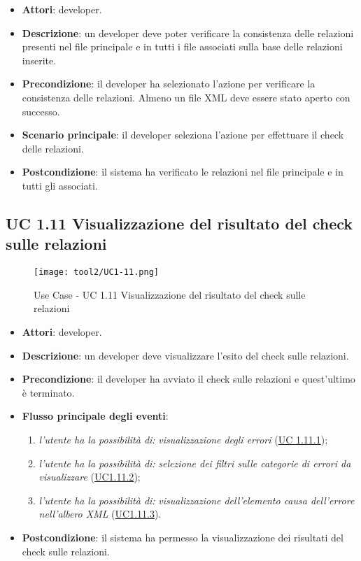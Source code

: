 		\begin{itemize}
			\item\textbf{Attori}: developer.
			\item\textbf{Descrizione}: un developer deve poter verificare la consistenza delle relazioni presenti nel file principale e in tutti i file associati sulla base delle relazioni inserite.
			\item\textbf{Precondizione}: il developer ha selezionato l'azione per verificare la consistenza delle relazioni. Almeno un file XML deve essere stato aperto con successo.
			\item\textbf{Scenario principale}: il developer seleziona l'azione per effettuare il check delle relazioni.
			\item\textbf{Postcondizione}: il sistema ha verificato le relazioni nel file principale e in tutti gli associati.
		\end{itemize}
		
	\subsection{UC 1.11 Visualizzazione del risultato del check sulle relazioni}
		\label{subsec:XEUC1.11}
		
		\begin{figure}[!h] 
			\centering 
			\texttt{[image: tool2/UC1-11.png]} 
			\caption{Use Case - UC 1.11 Visualizzazione del risultato del check sulle relazioni}
		\end{figure}
		
		\begin{itemize}
			\item\textbf{Attori}: developer.
			\item\textbf{Descrizione}: un developer deve visualizzare l'esito del check sulle relazioni.
			\item\textbf{Precondizione}: il developer ha avviato il check sulle relazioni e quest'ultimo è terminato.
			\item\textbf{Flusso principale degli eventi}: 
			\begin{enumerate}
				\item \textit{l'utente ha la possibilità di:} \textit{visualizzazione degli errori} (\hyperref[subsec:XEUC1.11.1]{UC 1.11.1});
				
				\item \textit{l'utente ha la possibilità di:} \textit{selezione dei filtri sulle categorie di errori da visualizzare} (\hyperref[subsec:XEUC1.11.2]{UC1.11.2});
				
				\item \textit{l'utente ha la possibilità di:} \textit{visualizzazione dell'elemento causa dell'errore nell'albero XML} (\hyperref[subsec:XEUC1.11.3]{UC1.11.3}).
				
			\end{enumerate}
			\item\textbf{Postcondizione}: il sistema ha permesso la visualizzazione dei risultati del check sulle relazioni.
		\end{itemize}
		
